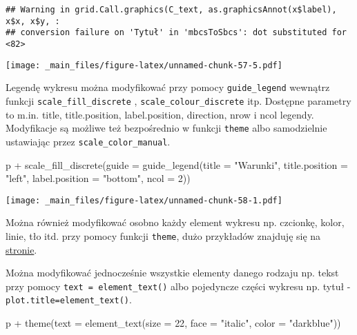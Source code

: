 \documentclass[
]{book}
\newenvironment{Shaded}{\begin{snugshade}}{\end{snugshade}}
\newcommand{\AttributeTok}[1]{\textcolor[rgb]{0.77,0.63,0.00}{#1}}
\newcommand{\DecValTok}[1]{\textcolor[rgb]{0.00,0.00,0.81}{#1}}
\newcommand{\FunctionTok}[1]{\textcolor[rgb]{0.00,0.00,0.00}{#1}}
\newcommand{\NormalTok}[1]{#1}
\newcommand{\SpecialCharTok}[1]{\textcolor[rgb]{0.00,0.00,0.00}{#1}}
\newcommand{\StringTok}[1]{\textcolor[rgb]{0.31,0.60,0.02}{#1}}
\begin{document}
\begin{verbatim}
## Warning in grid.Call.graphics(C_text, as.graphicsAnnot(x$label), x$x, x$y, :
## conversion failure on 'Tytuł' in 'mbcsToSbcs': dot substituted for <82>
\end{verbatim}

\texttt{[image: \_main\_files/figure-latex/unnamed-chunk-57-5.pdf]}

Legendę wykresu można modyfikować przy pomocy \texttt{guide\_legend} wewnątrz funkcji \texttt{scale\_fill\_discrete} , \texttt{scale\_colour\_discrete} itp. Dostępne parametry to m.in. title, title.position, label.position, direction, nrow i ncol legendy. Modyfikacje są możliwe też bezpośrednio w funkcji \texttt{theme} albo samodzielnie ustawiając przez \texttt{scale\_color\_manual}.

\begin{Shaded}
\begin{Highlighting}[]
\NormalTok{p }\SpecialCharTok{+} \FunctionTok{scale\_fill\_discrete}\NormalTok{(}\AttributeTok{guide =} \FunctionTok{guide\_legend}\NormalTok{(}\AttributeTok{title =} \StringTok{"Warunki"}\NormalTok{, }
                                           \AttributeTok{title.position =} \StringTok{"left"}\NormalTok{, }
                                           \AttributeTok{label.position =} \StringTok{"bottom"}\NormalTok{, }\AttributeTok{ncol =} \DecValTok{2}\NormalTok{))}
\end{Highlighting}
\end{Shaded}

\texttt{[image: \_main\_files/figure-latex/unnamed-chunk-58-1.pdf]}

Można również modyfikować osobno każdy element wykresu np. czcionkę, kolor, linie, tło itd. przy pomocy funkcji \texttt{theme}, dużo przykładów znajduję się na \href{http://docs.ggplot2.org/current/theme.html}{stronie}.

Można modyfikować jednocześnie wszystkie elementy danego rodzaju np. tekst przy pomocy \texttt{text\ =\ element\_text()} albo pojedyncze części wykresu np. tytuł - \texttt{plot.title=element\_text()}.

\begin{Shaded}
\begin{Highlighting}[]
\NormalTok{p }\SpecialCharTok{+} \FunctionTok{theme}\NormalTok{(}\AttributeTok{text =} \FunctionTok{element\_text}\NormalTok{(}\AttributeTok{size =} \DecValTok{22}\NormalTok{, }\AttributeTok{face =} \StringTok{"italic"}\NormalTok{, }\AttributeTok{color =} \StringTok{"darkblue"}\NormalTok{))}
\end{Highlighting}
\end{Shaded}
\end{document}
